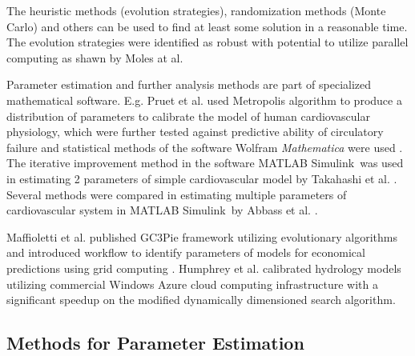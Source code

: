 The heuristic methods (evolution strategies), randomization methods (Monte Carlo) and others can be used to find at least some solution in a reasonable time. The evolution strategies were identified as robust with potential to utilize parallel computing as shawn by Moles at al.\cite{Moles2003}


Parameter estimation and further analysis methods are part of specialized mathematical software. E.g. Pruet et al. used Metropolis algorithm to produce a distribution of parameters to calibrate the model of human cardiovascular physiology, which were further tested against predictive ability of circulatory failure and statistical methods of the software Wolfram \textit{Mathematica} were used \cite{Pruett2013}. The iterative improvement method in the software MATLAB Simulink\textregistered ~was used in estimating 2 parameters of simple cardiovascular model by Takahashi et al. \cite{Takahashi2013}. Several methods were compared in estimating multiple parameters of cardiovascular system in MATLAB Simulink\textregistered ~by Abbass et al. \cite{Abbass2012}.

Maffioletti et al. published GC3Pie framework utilizing evolutionary algorithms and introduced workflow to identify parameters of models for economical predictions using grid computing \cite{maffioletti2012computational}. Humphrey et al. calibrated hydrology models utilizing commercial Windows Azure cloud computing infrastructure with a significant speedup on the modified dynamically dimensioned search algorithm\cite{Humphrey2012,Tolson2007}. 




\subsection{Methods for Parameter Estimation}
\label{sec:methodsestimation}


